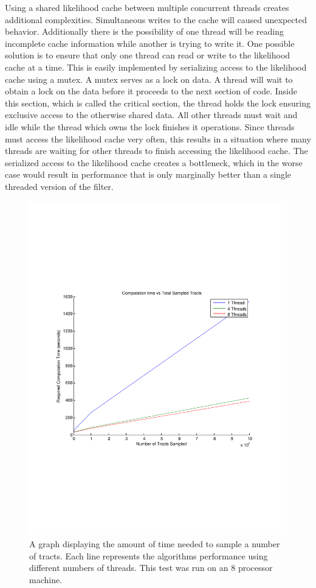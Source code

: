 Using a shared likelihood cache between multiple concurrent threads creates additional complexities.  Simultaneous writes to the cache will caused unexpected behavior.  Additionally there is the possibility of one thread will be reading incomplete cache information while another is trying to write it.  One possible solution is to ensure that only one thread can read or write to the likelihood cache at a time.  This is easily implemented by serializing access to the likelihood cache using a mutex.  A mutex serves as a lock on data.  A thread will wait to obtain a lock on the data before it proceeds to the next section of code.  Inside this section, which is called the critical section, the thread holds the lock ensuring exclusive access to the otherwise shared data.  All other threads must wait and idle while the thread which owns the lock finishes it operations.  Since threads must access the likelihood cache very often, this results in a situation where many threads are waiting for other threads to finish accessing the likelihood cache.  The serialized access to the likelihood cache creates a bottleneck, which in the worse case would result in performance that is only marginally better than a single threaded version of the filter.
\begin{figure} \label{fig:performance}
  \center
  \includegraphics[trim = 20mm 70mm 20mm 70mm, clip, width=0.5\linewidth]
	  {timepertracts}
	\caption{A graph displaying the amount of time needed to sample a number of tracts.  Each line represents the algorithms performance using different numbers of threads.  This test was run on an 8 processor machine.}
\end{figure}

